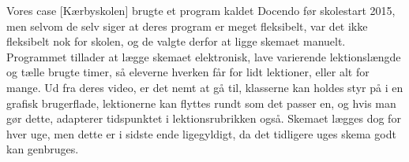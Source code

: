 Vores case [Kærbyskolen] brugte et program kaldet Docendo før skolestart 2015, men selvom de selv siger at deres program er meget fleksibelt\cite{Docendo}, var det ikke fleksibelt nok for skolen, og de valgte derfor at ligge skemaet manuelt. Programmet tillader at lægge skemaet elektronisk, lave varierende lektionslængde og tælle brugte timer, så eleverne hverken får for lidt lektioner, eller alt for mange. Ud fra deres video\cite{Docendo_video}, er det nemt at gå til, klasserne kan holdes styr på i en grafisk brugerflade, lektionerne kan flyttes rundt som det passer en, og hvis man gør dette, adapterer tidspunktet i lektionsrubrikken også. Skemaet lægges dog for hver uge, men dette er i sidste ende ligegyldigt, da det tidligere uges skema godt kan genbruges.
